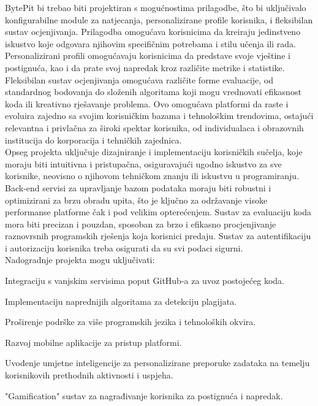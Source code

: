 		BytePit bi trebao biti projektiran s mogućnostima prilagodbe, što bi uključivalo 
		konfigurabilne module za natjecanja, personalizirane profile korisnika, i fleksibilan 
		sustav ocjenjivanja. Prilagodba omogućava korisnicima da kreiraju jedinstveno 
		iskustvo koje odgovara njihovim specifičnim potrebama i stilu učenja ili rada. 
		Personalizirani profili omogućavaju korisnicima da predstave svoje vještine i 
		postignuća, kao i da prate svoj napredak kroz različite metrike i statistike. 
		Fleksibilan sustav ocjenjivanja omogućava različite forme evaluacije, od standardnog 
		bodovanja do složenih algoritama koji mogu vrednovati efikasnost koda ili kreativno 
		rješavanje problema. Ovo omogućava platformi da raste i evoluira zajedno sa svojim 
		korisničkim bazama i tehnološkim trendovima, ostajući relevantna i privlačna za 
		široki spektar korisnika, od individualaca i obrazovnih institucija do korporacija 
		i tehničkih zajednica.
		\\

		Opseg projekta uključuje dizajniranje i implementaciju korisničkih sučelja, koje 
		moraju biti intuitivna i pristupačna, osiguravajući ugodno iskustvo za sve korisnike, 
		neovisno o njihovom tehničkom znanju ili iskustvu u programiranju. Back-end servisi 
		za upravljanje bazom podataka moraju biti robustni i optimizirani za brzu obradu 
		upita, što je ključno za održavanje visoke performanse platforme čak i pod velikim 
		opterećenjem. Sustav za evaluaciju koda mora biti precizan i pouzdan, sposoban za 
		brzo i efikasno procjenjivanje raznovrsnih programskih rješenja koja korisnici 
		predaju. Sustav za autentifikaciju i autorizaciju korisnika treba osigurati da su svi podaci sigurni.
		\\

		Nadogradnje projekta mogu uključivati:
		\begin{packed_item}
			\item Integraciju s vanjskim servisima poput GitHub-a za uvoz postojećeg koda.
			\item Implementaciju naprednijih algoritama za detekciju plagijata.
			\item Proširenje podrške za više programskih jezika i tehnoloških okvira.
			\item Razvoj mobilne aplikacije za pristup platformi.
			\item Uvođenje umjetne inteligencije za personalizirane preporuke zadataka
			na temelju korisnikovih prethodnih aktivnosti i uspjeha.
			\item "Gamification" sustav za nagrađivanje korisnika za postignuća i napredak.
		\end{packed_item}


		\eject
		
		
	